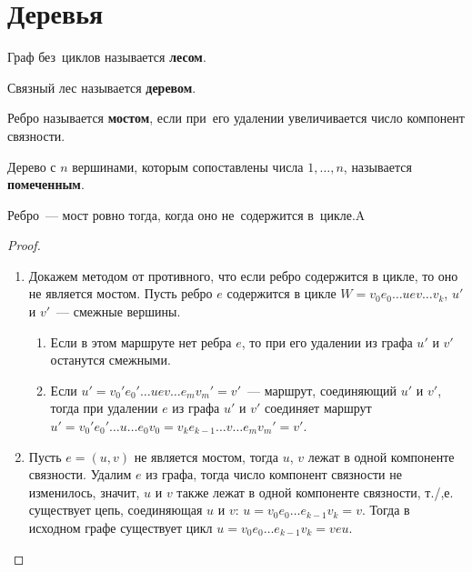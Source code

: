 \section{Деревья}

Граф без~циклов называется \textbf{лесом}.

Связный лес называется \textbf{деревом}.

Ребро называется \textbf{мостом}, если при~его удалении увеличивается число компонент связности.

Дерево с $n$ вершинами, которым сопоставлены числа $1, \ldots, n$, называется \textbf{помеченным}.

\begin{statement}
Ребро~--- мост ровно тогда, когда оно не~содержится в~цикле.A
\end{statement}
\begin{proof}
\begin{enumerate}
	\item Докажем методом от противного, что если ребро содержится в цикле, то оно не является мостом. Пусть ребро $e$ содержится в цикле $W = v_0 e_0 \ldots u e v \ldots v_k$, $u'$ и $v'$~--- смежные вершины.
	\begin{enumerate}
		\item Если в этом маршруте нет ребра $e$, то при его удалении из графа $u'$ и $v'$ останутся смежными.
		\item Если $u' = v_0' e_0' \ldots u e v \ldots e_m v_m' = v'$~--- маршрут, соединяющий $u'$ и $v'$, тогда при удалении $e$ из графа $u'$ и $v'$ соединяет маршрут $u' = v_0' e_0' \ldots u \ldots e_0 v_0 = v_k e_{k-1} \ldots v \ldots e_m v_m' = v'$.
	\end{enumerate}
	\item Пусть $e = (u, v)$ не является мостом, тогда $u$, $v$ лежат в одной компоненте связности. Удалим $e$ из графа, тогда число компонент связности не изменилось, значит, $u$ и $v$ также лежат в одной компоненте связности, т./,е. существует цепь, соединяющая $u$ и $v$: $u = v_0 e_0 \ldots e_{k-1} v_k = v$. Тогда в исходном графе существует цикл $u = v_0 e_0 \ldots e_{k-1} v_k = v e u$.
\end{enumerate}
\end{proof}


